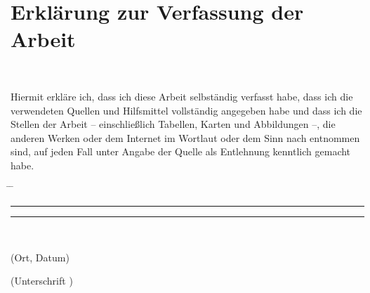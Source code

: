%
%
%
%
%
%


\chapter*{Erklärung zur Verfassung der Arbeit}

\tuinfthesisauthorname\\
\tuinfthesisauthoraddress

\vspace*{1.2cm}
Hiermit erkläre ich, dass ich diese Arbeit selbständig verfasst habe, dass ich die verwendeten Quellen und Hilfsmittel vollständig angegeben habe und dass ich die Stellen der Arbeit -- einschließlich Tabellen, Karten und Abbildungen --, die anderen Werken oder dem Internet im Wortlaut oder dem Sinn nach entnommen sind, auf jeden Fall unter Angabe der Quelle als Entlehnung kenntlich gemacht habe.\\
\vspace*{2cm}
\begin{tabbing}%
    \hspace{58mm} \= \hspace{28mm} \= \hspace{58mm} \kill
    {\raggedright\rule{58mm}{0.5pt}} \> \> {\raggedright\rule{58mm}{0.5pt}} \\
    \begin{minipage}[t][0.5cm][t]{58mm}
	\vspace{0pt}\sffamily\thesistitlefontnormalsize
	\centering (Ort, Datum)
    \end{minipage}
    \> \>
    \begin{minipage}[t][0.5cm][t]{58mm}
	\vspace{0pt}\sffamily\thesistitlefontnormalsize
	\centering (Unterschrift \tuinfthesisverfasser)
    \end{minipage}
\end{tabbing}